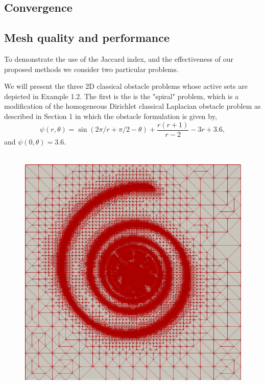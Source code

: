\documentclass[]{interact}
\theoremstyle{plain}%
\theoremstyle{definition}
\theoremstyle{remark}
\begin{document}
\subsection{Convergence} \label{subsec:convergence}


\subsection{Mesh quality and performance} \label{subsec:performance}


To demonstrate the use of the Jaccard index, and the effectiveness of our proposed methods we consider two particular problems. 




We will present the three 2D classical obstacle problems whose active sets are depicted in Example 1.2. The first is the is the "spiral" problem, which is a modification of the homogeneous Dirichlet classical Laplacian obstacle problem as described in Section 1 in which the obstacle formulation is given by, 
\begin{equation}
  \psi(r, \theta) = \sin(2\pi/r + \pi/2 - \theta) + \frac{r(r + 1)}{r - 2} - 3r + 3.6,
\end{equation}
and $\psi(0, \theta) = 3.6$. 

\begin{figure}[ht]
\centering
\mbox{
\includegraphics[width = .75\textwidth]{meshfigs/spiral.png}
}
\caption{}
\label{fig:spiralmeshfig}
\end{figure}
\end{document}
